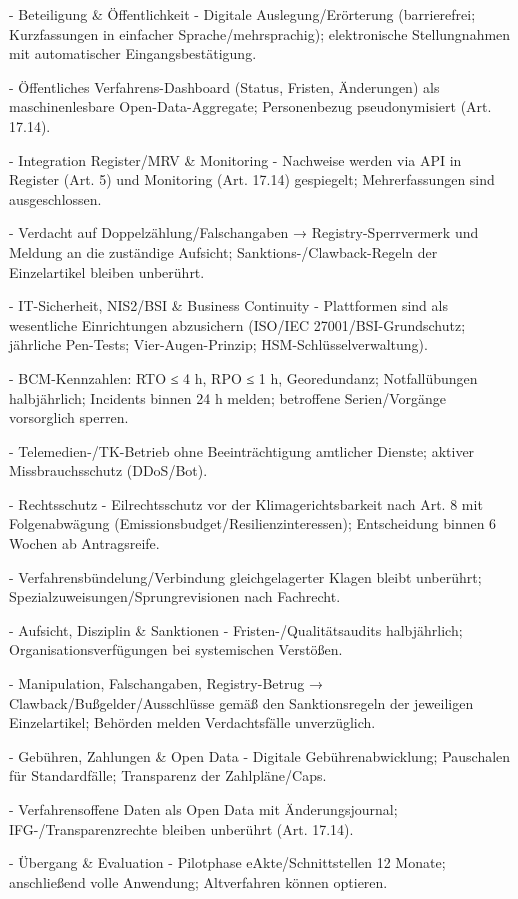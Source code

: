 \documentclass[12pt,a4paper]{scrartcl}
\begin{document}
- Beteiligung \& Öffentlichkeit
- Digitale Auslegung/Erörterung (barrierefrei; Kurzfassungen in einfacher Sprache/mehrsprachig); elektronische Stellungnahmen mit automatischer Eingangsbestätigung.

- Öffentliches Verfahrens-Dashboard (Status, Fristen, Änderungen) als maschinenlesbare Open-Data-Aggregate; Personenbezug pseudonymisiert (Art. 17.14).

- Integration Register/MRV \& Monitoring
- Nachweise werden via API in Register (Art. 5) und Monitoring (Art. 17.14) gespiegelt; Mehrerfassungen sind ausgeschlossen.

- Verdacht auf Doppelzählung/Falschangaben → Registry-Sperrvermerk und Meldung an die zuständige Aufsicht; Sanktions-/Clawback-Regeln der Einzelartikel bleiben unberührt.

- IT-Sicherheit, NIS2/BSI \& Business Continuity
- Plattformen sind als wesentliche Einrichtungen abzusichern (ISO/IEC 27001/BSI-Grundschutz; jährliche Pen-Tests; Vier-Augen-Prinzip; HSM-Schlüsselverwaltung).

- BCM-Kennzahlen: RTO ≤ 4 h, RPO ≤ 1 h, Georedundanz; Notfallübungen halbjährlich; Incidents binnen 24 h melden; betroffene Serien/Vorgänge vorsorglich sperren.

- Telemedien-/TK-Betrieb ohne Beeinträchtigung amtlicher Dienste; aktiver Missbrauchsschutz (DDoS/Bot).

- Rechtsschutz
- Eilrechtsschutz vor der Klimagerichtsbarkeit nach Art. 8 mit Folgenabwägung (Emissionsbudget/Resilienzinteressen); Entscheidung binnen 6 Wochen ab Antragsreife.

- Verfahrensbündelung/Verbindung gleichgelagerter Klagen bleibt unberührt; Spezialzuweisungen/Sprungrevisionen nach Fachrecht.

- Aufsicht, Disziplin \& Sanktionen
- Fristen-/Qualitätsaudits halbjährlich; Organisationsverfügungen bei systemischen Verstößen.

- Manipulation, Falschangaben, Registry-Betrug → Clawback/Bußgelder/Ausschlüsse gemäß den Sanktionsregeln der jeweiligen Einzelartikel; Behörden melden Verdachtsfälle unverzüglich.

- Gebühren, Zahlungen \& Open Data
- Digitale Gebührenabwicklung; Pauschalen für Standardfälle; Transparenz der Zahlpläne/Caps.

- Verfahrensoffene Daten als Open Data mit Änderungsjournal; IFG-/Transparenzrechte bleiben unberührt (Art. 17.14).

- Übergang \& Evaluation
- Pilotphase eAkte/Schnittstellen 12 Monate; anschließend volle Anwendung; Altverfahren können optieren.
\end{document}
